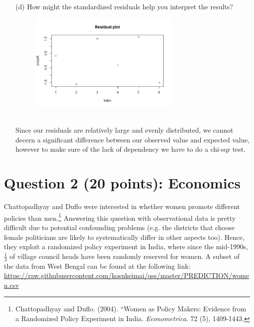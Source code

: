 \documentclass[12pt,letterpaper]{article}
\begin{document}
\begin{enumerate}
	\item [(d)] How might the standardized residuals help you interpret the results?  
	\begin{figure}[h!]
		\label{Residual}
		\includegraphics[width=0.7\textwidth]{Residual.jpeg}
	\end{figure}
	\\Since our residuals are relatively large and evenly distributed, we cannot decern a significant difference between our observed value and expected value, however to make sure of the lack of dependency we have to do a chi-sqr test.
	
\end{enumerate}
\newpage

\section*{Question 2 (20 points): Economics}
Chattopadhyay and Duflo were interested in whether women promote different policies than men.\footnote{Chattopadhyay and Duflo. (2004). ``Women as Policy Makers: Evidence from a Randomized Policy Experiment in India. \textit{Econometrica}. 72 (5), 1409-1443.} Answering this question with observational data is pretty difficult due to potential confounding problems (e.g. the districts that choose female politicians are likely to systematically differ in other aspects too). Hence, they exploit a randomized policy experiment in India, where since the mid-1990s, $\frac{1}{3}$ of village council heads have been randomly reserved for women. A subset of the data from West Bengal can be found at the following link: \url{https://raw.githubusercontent.com/kosukeimai/qss/master/PREDICTION/women.csv}\\
\end{document}
